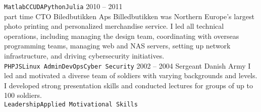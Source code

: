 \documentclass[8pt]{mofiicv}
\begin{document}
\begin{minipage}[T]{\SecondColumnWidth}
\begin{entrylist}
{		\texttt{Matlab}\slashsep\texttt{C}\slashsep\texttt{CUDA}\slashsep\texttt{Python}\slashsep\texttt{Julia}
		}
	\entry
		{2010 -- 2011\\\footnotesize{part time}}
		{CTO}
		{Biledbutikken Aps}
		{
		Billedbutikken was Northern Europe’s largest photo printing and personalized merchandise service. I led all technical operations, including managing the design team, coordinating with overseas programming teams, managing web and NAS servers, setting up network infrastructure, and driving cybersecurity initiatives.\\
		\texttt{PHP}\slashsep\texttt{JS}\slashsep\texttt{Linux Admin}\slashsep\texttt{DevOps}\slashsep\texttt{Cyber Security}
		}
	\entry
		{2002 -- 2004}
		{Sergeant}
		{Danish Army}
		{
		I led and motivated a diverse team of soldiers with varying backgrounds and levels. I developed strong presentation skills and conducted lectures for groups of up to 100 soldiers.\\ 
		\texttt{Leadership}\slashsep\texttt{Applied Motivational Skills}
		}
\end{entrylist}


\end{minipage}
\end{document}
